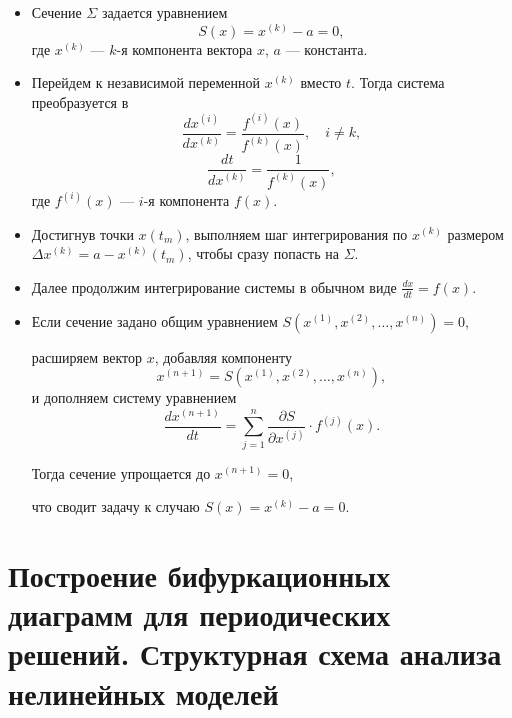 	\begin{itemize}
		\item Сечение \(\Sigma\) задается уравнением
		\begin{equation}
			S(x) = x^{(k)} - a = 0,
		\end{equation}
		где \(x^{(k)}\) — \(k\)-я компонента вектора \(x\), \(a\) — константа. 
		\item Перейдем к независимой переменной \(x^{(k)}\) вместо \(t\). Тогда система преобразуется в
		\begin{equation}
			\frac{dx^{(i)}}{dx^{(k)}} = \frac{f^{(i)}(x)}{f^{(k)}(x)}, \quad i \neq k,
		\end{equation}
		\begin{equation}
			\frac{dt}{dx^{(k)}} = \frac{1}{f^{(k)}(x)},
		\end{equation}
		где \(f^{(i)}(x)\) — \(i\)-я компонента \(f(x)\).
		
		\item Достигнув точки \(x(t_m)\), выполняем шаг интегрирования по \(x^{(k)}\) размером \(\Delta x^{(k)} = a - x^{(k)}(t_m)\), чтобы сразу попасть на \(\Sigma\).
		
		\item Далее продолжим интегрирование системы в обычном виде \(\frac{dx}{dt} = f(x).\)
		
		\item Если сечение задано общим уравнением \(S(x^{(1)}, x^{(2)}, \dots, x^{(n)}) = 0\), 
		\par
		расширяем вектор \(x\), добавляя компоненту
		\begin{equation}
			x^{(n+1)} = S(x^{(1)}, x^{(2)}, \dots, x^{(n)}),
		\end{equation}
		и дополняем систему уравнением
		\begin{equation}
			\frac{dx^{(n+1)}}{dt} = \sum_{j=1}^n \frac{\partial S}{\partial x^{(j)}} \cdot f^{(j)}(x).
		\end{equation}
		
		Тогда сечение упрощается до \(x^{(n+1)} = 0\),
		\par
		что сводит задачу к случаю \(S(x) = x^{(k)} - a = 0\).
	
	\end{itemize}
	
	\section{Построение бифуркационных диаграмм для периодических решений. Структурная схема анализа нелинейных моделей}
	
